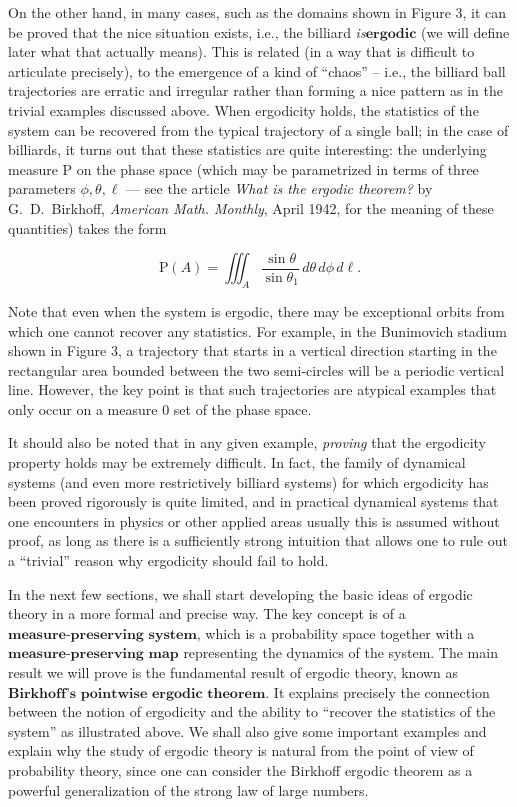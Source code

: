 \noindent On the other hand, in many cases, such as the domains
shown in Figure 3, it can be proved that the nice
situation exists, i.e., the billiard \emph{is}$\textbf{ergodic}$ (we will define later what that
actually means). This is related (in a way that is
difficult to articulate precisely), to the emergence
of a kind of ``chaos'' -- i.e., the billiard ball
trajectories are erratic and irregular rather than
forming a nice pattern as in the trivial examples
discussed above. When ergodicity holds, the statistics
of the system can be recovered from the typical
trajectory of a single ball; in the case of billiards,
it turns out that these statistics are quite
interesting: the underlying measure $\mathrm{P}$ on
the phase space (which may be parametrized in terms of
three parameters $\phi, \theta, \ell$ --- see the
article \emph{What is the ergodic theorem?} by
G.~D.~Birkhoff, \emph{American Math. Monthly}, April 1942,
for the meaning of these quantities) takes the form

\[
\mathrm{P}(A) = \iiint_A \frac{\sin \theta}{\sin\theta_1} \,d\theta\,d\phi\,d\ell.
\]

\noindent Note that even when the system is ergodic, there may
be exceptional orbits from which one cannot recover
any statistics. For example, in the Bunimovich stadium
shown in Figure 3, a trajectory that starts in a
vertical direction starting in the rectangular area
bounded between the two semi-circles will be a
periodic vertical line. However, the key point is that
such trajectories are atypical examples that only
occur on a measure 0 set of the phase space.

It should also be noted that in any given example,
\emph{proving} that the ergodicity property holds may be
extremely difficult. In fact, the family of dynamical
systems (and even more restrictively billiard systems)
for which ergodicity has been proved rigorously is
quite limited, and in practical dynamical systems that
one encounters in physics or other applied areas
usually this is assumed without proof, as long as
there is a sufficiently strong intuition that allows
one to rule out a ``trivial'' reason why ergodicity
should fail to hold.

In the next few sections, we shall start developing
the basic ideas of ergodic theory in a more formal and
precise way. The key concept is of a
$\textbf{measure-preserving system}$, which is a
probability space together with a
$\textbf{measure-preserving map}$ representing the
dynamics of the system. The main result we will prove
is the fundamental result of ergodic theory, known as
$\textbf{Birkhoff's pointwise ergodic theorem}$. It
explains precisely the connection between the notion
of ergodicity and the ability to ``recover the
statistics of the system'' as illustrated above. We
shall also give some important examples and explain
why the study of ergodic theory is natural from the
point of view of probability theory, since one can
consider the Birkhoff ergodic theorem as a powerful
generalization of the strong law of large numbers.